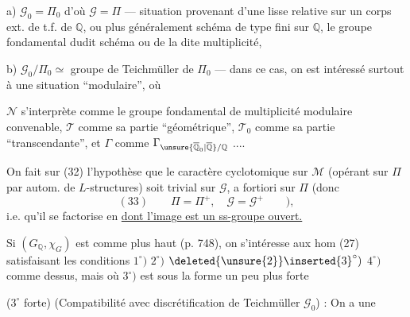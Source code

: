 a) $\mathcal{G}_0=\Pi_0$ d'où $\mathcal{G}=\Pi$ --- situation provenant d'une  lisse relative sur un corps  ext. de t.f. de $\mathbb{Q}$, ou plus généralement  schéma   de type fini sur $\mathbb{Q}$,   le groupe fondamental dudit  schéma ou de la dite multiplicité,

b) $\mathcal{G}_0/\Pi_0\simeq$ groupe de Teichmüller de $\Pi_0$  --- dans ce cas, on est intéressé surtout à une situation ``modulaire'', où


$\mathcal{N}$ s'interprète comme le groupe fondamental de  multiplicité modulaire convenable, $\mathcal{T}$ comme sa partie ``géométrique'', $\mathcal{T}_0$ comme sa partie ``transcendante'', et $\Gamma$ comme $\Gamma_{\unsure{\overline{\mathbb{Q}}_0|\overline{\mathbb{Q}}}/\mathbb{Q}}$ ....

On fait sur (32) l'hypothèse que le caractère cyclotomique sur $\mathcal{M}$ (opérant sur $\Pi$ par autom. de $L$-structures) soit trivial sur $\mathcal{G}$, a fortiori sur $\Pi$ (donc
\[
(33)\qquad \Pi=\Pi^{+},\quad \mathcal{G}=\mathcal{G}^{+}\qquad ),
\]
i.e. qu'il se factorise en
\uline{dont l'image est un ss-groupe ouvert.}

Si $(G_{\mathbb{Q}},\chi_G)$ est comme plus haut (p. 748), on s'intéresse aux hom (27)
satisfaisant les conditions $1^{\circ})$ $2^{\circ})$ $\deleted{\unsure{2}}\inserted{3}^{\circ})$ $4^{\circ})$ comme dessus, mais où $3^{\circ})$ est  sous la forme un peu plus forte

($3^{\circ}$ forte) (Compatibilité avec discrétification de Teichmüller $\mathcal{G}_0$) : On a une 


